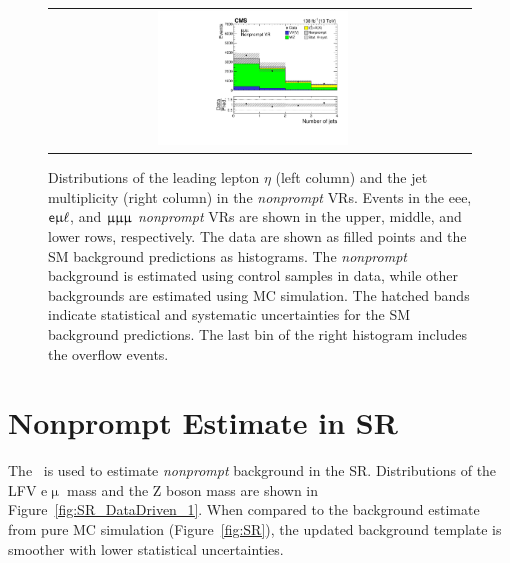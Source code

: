 \begin{figure}[tbh!]
\begin{center}
\begin{tabular}{cc}
 \includegraphics[width=0.48\textwidth]{figures/Part3/Nonprompt/VR/mumumu/njet} \\
 \end{tabular}
 \caption{Distributions of the leading lepton $\eta$ (left column) and the jet multiplicity (right column) in the \emph{nonprompt} \acp{VR}. Events in the eee, $\textsf{e}\upmu\ell$, and $\upmu\upmu\upmu$ \emph{nonprompt} \acp{VR} are shown in the upper, middle, and lower rows, respectively. The data are shown as filled points and the \ac{SM} background predictions as histograms. The \emph{nonprompt} background is estimated using control samples in data, while other backgrounds are estimated using \ac{MC} simulation. The hatched bands indicate statistical and systematic uncertainties for the \ac{SM} background predictions. The last bin of the right histogram includes the overflow events.}
 \label{fig:VR_matrix}
 \end{center}
\end{figure}

\section{Nonprompt Estimate in SR}
\label{sec:MMSR}

The \mm~is used to estimate \emph{nonprompt} background in the \ac{SR}. Distributions of the LFV e$\upmu$ mass and the Z boson mass are shown in Figure~\ref{fig:SR_DataDriven_1}. When compared to the background estimate from pure \ac{MC} simulation (Figure~\ref{fig:SR}), the updated background template is smoother with lower statistical uncertainties. 

